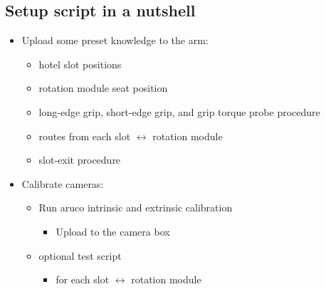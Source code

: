 \documentclass[11pt,a4paper]{article}
\begin{document}
\subsection*{Setup script in a nutshell}
\begin{itemize}[nosep]
  \item Upload some preset knowledge to the arm:
  \begin{itemize}[nosep]
    \item hotel slot positions
    \item rotation module seat position
    \item long-edge grip, short-edge grip, and grip torque probe procedure
    \item routes from each slot $\leftrightarrow$ rotation module
    \item slot-exit procedure
  \end{itemize}
  \item Calibrate cameras:
  \begin{itemize}[nosep]
    \item Run aruco intrinsic and extrinsic calibration
    \begin{itemize}[nosep]
      \item Upload to the camera box
    \end{itemize}
    \item optional test script
    \begin{itemize}[nosep]
      \item for each slot $\leftrightarrow$ rotation module
    \end{itemize}
  \end{itemize}
\end{itemize}
\end{document}
